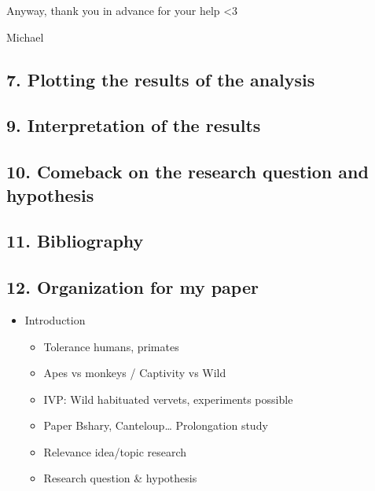 \documentclass[
]{article}
\providecommand{\tightlist}{%
  \setlength{\itemsep}{0pt}\setlength{\parskip}{0pt}}
\begin{document}
Anyway, thank you in advance for your help \textless3

Michael

\hypertarget{plotting-the-results-of-the-analysis}{%
\subsection{7. Plotting the results of the
analysis}\label{plotting-the-results-of-the-analysis}}

\hypertarget{interpretation-of-the-results}{%
\subsection{9. Interpretation of the
results}\label{interpretation-of-the-results}}

\hypertarget{comeback-on-the-research-question-and-hypothesis}{%
\subsection{10. Comeback on the research question and
hypothesis}\label{comeback-on-the-research-question-and-hypothesis}}

\hypertarget{bibliography}{%
\subsection{11. Bibliography}\label{bibliography}}

\hypertarget{organization-for-my-paper}{%
\subsection{12. Organization for my
paper}\label{organization-for-my-paper}}

\begin{itemize}
\tightlist
\item
  Introduction

  \begin{itemize}
  \tightlist
  \item
    Tolerance humans, primates
  \item
    Apes vs monkeys / Captivity vs Wild
  \item
    IVP: Wild habituated vervets, experiments possible
  \item
    Paper Bshary, Canteloup\ldots{} Prolongation study
  \item
    Relevance idea/topic research
  \item
    Research question \& hypothesis
  \end{itemize}
\end{itemize}
\end{document}
